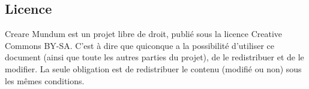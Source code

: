 \documentclass{book}
\begin{document}
\subsection{Licence}
Creare Mundum est un projet libre de droit, publié sous la licence Creative Commons BY-SA. C'est à dire que quiconque a la possibilité d'utiliser ce document (ainsi que toute les autres parties du projet), de le redistribuer et de le modifier. La seule obligation est de redistribuer le contenu (modifié ou non) sous les mêmes conditions.
\end{document}
